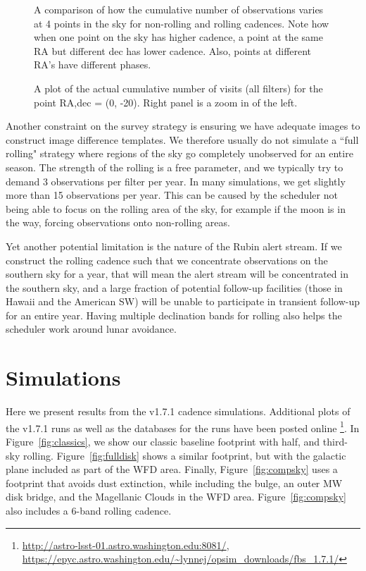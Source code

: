 \documentclass[modern]{aastex62}
\begin{document}
\begin{figure}
\caption{A comparison of how the cumulative number of observations varies at 4 points in the sky for non-rolling and rolling cadences. Note how when one point on the sky has higher cadence, a point at the same RA but different dec has lower cadence. Also, points at different RA's have different phases. \label{fig:ideal_foot}}
\end{figure}

\begin{figure}
\caption{A plot of the actual cumulative number of visits (all filters) for the point RA,dec = (0, -20). Right panel is a zoom in of the left. \label{fig:actual_foot}}
\end{figure}




Another constraint on the survey strategy is ensuring we have adequate images to construct image difference templates. We therefore usually do not simulate a ``full rolling" strategy where regions of the sky go completely unobserved for an entire season. The strength of the rolling is a free parameter, and we typically try to demand 3 observations per filter per year. In many simulations, we get slightly more than 15 observations per year. This can be caused by the scheduler not being able to focus on the rolling area of the sky, for example if the moon is in the way, forcing observations onto non-rolling areas.

Yet another potential limitation is the nature of the Rubin alert stream. If we construct the rolling cadence such that we concentrate observations on the southern sky for a year, that will mean the alert stream will be concentrated in the southern sky, and a large fraction of potential follow-up facilities (those in Hawaii and the American SW) will be unable to participate in transient follow-up for an entire year. Having multiple declination bands for rolling also helps the scheduler work around lunar avoidance.




\section{Simulations}

Here we present results from the v1.7.1 cadence simulations. Additional plots of the v1.7.1 runs as well as the databases for the runs have been posted online \footnote{\url{http://astro-lsst-01.astro.washington.edu:8081/}, \url{https://epyc.astro.washington.edu/~lynnej/opsim_downloads/fbs_1.7.1/}}.  In Figure~\ref{fig:classics}, we show our classic baseline footprint with half, and third-sky rolling. Figure~\ref{fig:fulldisk} shows a similar footprint, but with the galactic plane included as part of the WFD area. Finally, Figure~\ref{fig:compsky} uses a footprint that avoids dust extinction, while including the bulge, an outer MW disk bridge, and the Magellanic Clouds in the WFD area. Figure~\ref{fig:compsky} also includes a 6-band rolling cadence. 
\end{document}
